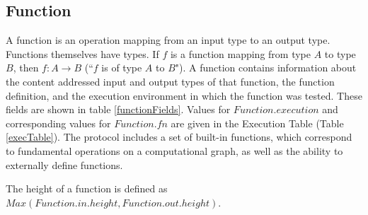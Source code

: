 \documentclass[9pt, oneside]{article}   	%
\begin{document}
\subsection{Function}\label{function}
A function is an operation mapping from an input type to an output type. Functions themselves have types. If $f$ is a function mapping from type $A$ to type $B$, then $f : A \rightarrow B$ (``$f$ is of type $A$ to $B$"). A function contains information about the content addressed input and output types of that function, the function definition, and the execution environment in which the function was tested. These fields are shown in table \ref{functionFields}.
Values for $Function.execution$ and corresponding values for $Function.fn$ are given in the Execution Table (Table \ref{execTable}). The protocol includes a set of built-in functions, which correspond to fundamental operations on a computational graph, as well as the ability to externally define functions.

The height of a function is defined as $Max( Function.in.height, Function.out.height )$.
\end{document}

